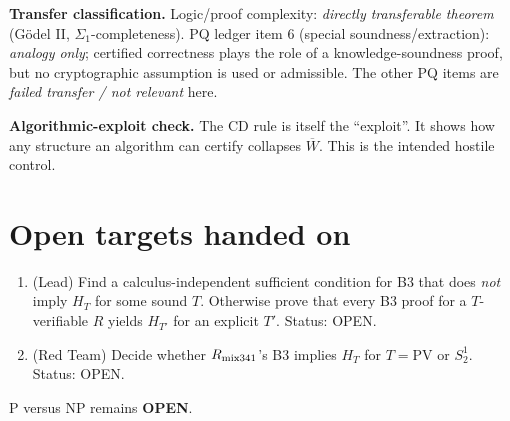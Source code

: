 \documentclass[11pt]{article}
\newcommand{\Wb}{\overline W}
\begin{document}
\textbf{Transfer classification.} Logic/proof complexity: \emph{directly transferable
theorem} (G\"odel II, $\Sigma_1$-completeness). PQ ledger item 6 (special
soundness/extraction): \emph{analogy only}; certified correctness plays the role of a
knowledge-soundness proof, but no cryptographic assumption is used or admissible. The other
PQ items are \emph{failed transfer / not relevant} here.

\textbf{Algorithmic-exploit check.} The CD rule is itself the ``exploit''. It shows how any
structure an algorithm can certify collapses $\Wb$. This is the intended hostile control.

\section{Open targets handed on}
\begin{enumerate}
\item (Lead) Find a calculus-independent sufficient condition for B3 that does \emph{not}
imply $H_T$ for some sound $T$. Otherwise prove that every B3 proof for a $T$-verifiable
$R$ yields $H_{T'}$ for an explicit $T'$. Status: OPEN.
\item (Red Team) Decide whether $R_{\rm mix341}$'s B3 implies $H_T$ for $T=\mathrm{PV}$ or
$S^1_2$. Status: OPEN.
\end{enumerate}
P versus NP remains \textbf{OPEN}.
\end{document}
